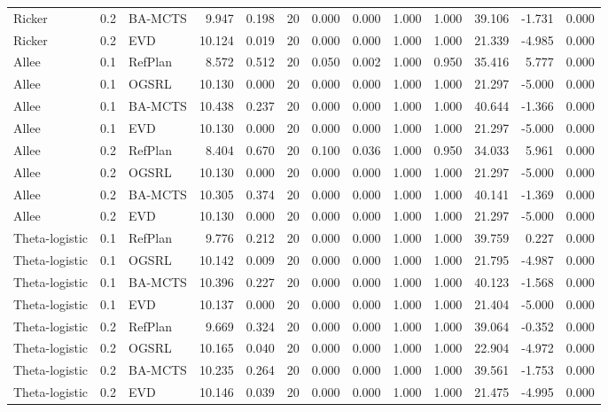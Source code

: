 \documentclass[10pt]{article}
\begin{document}
\begin{landscape}
\begin{center}
\begin{longtable}{@{}lllr@{}r@{}r@{}rrrrrrr@{}}
Ricker & 0.2 & BA-MCTS & 9.947 & 0.198 & 20 & 0.000 & 0.000 & 1.000 & 1.000 & 39.106 & -1.731 & 0.000 \\
Ricker & 0.2 & EVD & 10.124 & 0.019 & 20 & 0.000 & 0.000 & 1.000 & 1.000 & 21.339 & -4.985 & 0.000 \\
\addlinespace[1.5pt]
Allee & 0.1 & RefPlan & 8.572 & 0.512 & 20 & 0.050 & 0.002 & 1.000 & 0.950 & 35.416 & 5.777 & 0.000 \\
Allee & 0.1 & OGSRL & 10.130 & 0.000 & 20 & 0.000 & 0.000 & 1.000 & 1.000 & 21.297 & -5.000 & 0.000 \\
Allee & 0.1 & BA-MCTS & 10.438 & 0.237 & 20 & 0.000 & 0.000 & 1.000 & 1.000 & 40.644 & -1.366 & 0.000 \\
Allee & 0.1 & EVD & 10.130 & 0.000 & 20 & 0.000 & 0.000 & 1.000 & 1.000 & 21.297 & -5.000 & 0.000 \\
\addlinespace[1.5pt]
Allee & 0.2 & RefPlan & 8.404 & 0.670 & 20 & 0.100 & 0.036 & 1.000 & 0.950 & 34.033 & 5.961 & 0.000 \\
Allee & 0.2 & OGSRL & 10.130 & 0.000 & 20 & 0.000 & 0.000 & 1.000 & 1.000 & 21.297 & -5.000 & 0.000 \\
Allee & 0.2 & BA-MCTS & 10.305 & 0.374 & 20 & 0.000 & 0.000 & 1.000 & 1.000 & 40.141 & -1.369 & 0.000 \\
Allee & 0.2 & EVD & 10.130 & 0.000 & 20 & 0.000 & 0.000 & 1.000 & 1.000 & 21.297 & -5.000 & 0.000 \\
\addlinespace[1.5pt]
Theta-logistic & 0.1 & RefPlan & 9.776 & 0.212 & 20 & 0.000 & 0.000 & 1.000 & 1.000 & 39.759 & 0.227 & 0.000 \\
Theta-logistic & 0.1 & OGSRL & 10.142 & 0.009 & 20 & 0.000 & 0.000 & 1.000 & 1.000 & 21.795 & -4.987 & 0.000 \\
Theta-logistic & 0.1 & BA-MCTS & 10.396 & 0.227 & 20 & 0.000 & 0.000 & 1.000 & 1.000 & 40.123 & -1.568 & 0.000 \\
Theta-logistic & 0.1 & EVD & 10.137 & 0.000 & 20 & 0.000 & 0.000 & 1.000 & 1.000 & 21.404 & -5.000 & 0.000 \\
\addlinespace[1.5pt]
Theta-logistic & 0.2 & RefPlan & 9.669 & 0.324 & 20 & 0.000 & 0.000 & 1.000 & 1.000 & 39.064 & -0.352 & 0.000 \\
Theta-logistic & 0.2 & OGSRL & 10.165 & 0.040 & 20 & 0.000 & 0.000 & 1.000 & 1.000 & 22.904 & -4.972 & 0.000 \\
Theta-logistic & 0.2 & BA-MCTS & 10.235 & 0.264 & 20 & 0.000 & 0.000 & 1.000 & 1.000 & 39.561 & -1.753 & 0.000 \\
Theta-logistic & 0.2 & EVD & 10.146 & 0.039 & 20 & 0.000 & 0.000 & 1.000 & 1.000 & 21.475 & -4.995 & 0.000 \\

\end{longtable}
\end{center}
\end{landscape}
\end{document}
